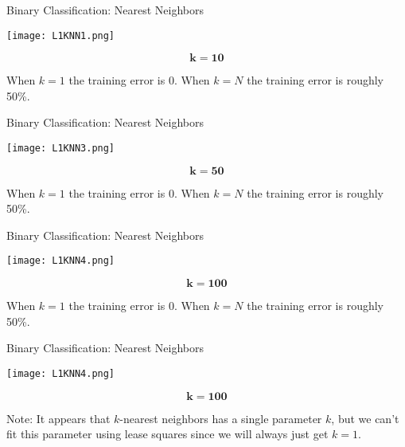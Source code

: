 \documentclass[10pt, handout]{beamer}
\begin{document}
\begin{frame}[fragile]{Binary Classification: Nearest Neighbors}
  \begin{minipage}[t][0.5\textheight][t]{\textwidth}
    \centering
     \texttt{[image: L1KNN1.png]}
  \end{minipage}
  \vfill
  \begin{minipage}[t][0.5\textheight][t]{\textwidth}
$$
\mathbf{k=10}
$$

When $k=1$ the training error is 0. When $k = N$ the training error is roughly 50\%.  
 \end{minipage}
\end{frame}



\begin{frame}[fragile]{Binary Classification: Nearest Neighbors}
  \begin{minipage}[t][0.5\textheight][t]{\textwidth}
    \centering
     \texttt{[image: L1KNN3.png]}
  \end{minipage}
  \vfill
  \begin{minipage}[t][0.5\textheight][t]{\textwidth}
$$
\mathbf{k=50}
$$

When $k=1$ the training error is 0. When $k = N$ the training error is roughly 50\%.  
 \end{minipage}
\end{frame}


\begin{frame}[fragile]{Binary Classification: Nearest Neighbors}
  \begin{minipage}[t][0.5\textheight][t]{\textwidth}
    \centering
     \texttt{[image: L1KNN4.png]}
  \end{minipage}
  \vfill
  \begin{minipage}[t][0.5\textheight][t]{\textwidth}
$$
\mathbf{k=100}
$$

When $k=1$ the training error is 0. When $k = N$ the training error is roughly 50\%.  
 \end{minipage}
\end{frame}


\begin{frame}[fragile]{Binary Classification: Nearest Neighbors}
  \begin{minipage}[t][0.5\textheight][t]{\textwidth}
    \centering
     \texttt{[image: L1KNN4.png]}
  \end{minipage}
  \vfill
  \begin{minipage}[t][0.5\textheight][t]{\textwidth}
$$
\mathbf{k=100}
$$

Note: It appears that $k$-nearest neighbors has a single parameter $k$, but we can't fit this parameter using lease squares since we will always just get $k=1$. 
 \end{minipage}
\end{frame}
\end{document}
